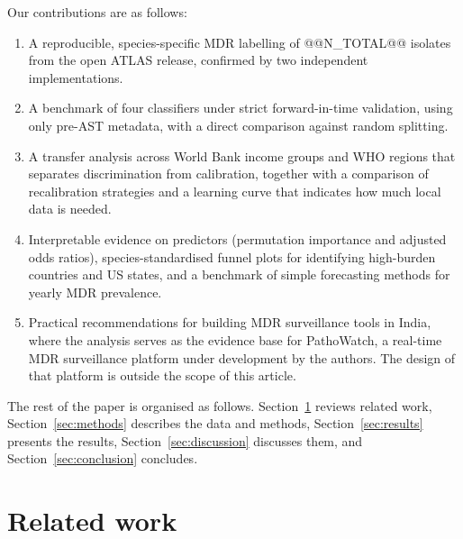 \documentclass[11pt,a4paper]{article}
\begin{document}
Our contributions are as follows:
\begin{enumerate}
\item A reproducible, species-specific MDR labelling of @@N_TOTAL@@ isolates from the open ATLAS release, confirmed by two independent implementations.
\item A benchmark of four classifiers under strict forward-in-time validation, using only pre-AST metadata, with a direct comparison against random splitting.
\item A transfer analysis across World Bank income groups and WHO regions that separates discrimination from calibration, together with a comparison of recalibration strategies and a learning curve that indicates how much local data is needed.
\item Interpretable evidence on predictors (permutation importance and adjusted odds ratios), species-standardised funnel plots for identifying high-burden countries and US states, and a benchmark of simple forecasting methods for yearly MDR prevalence.
\item Practical recommendations for building MDR surveillance tools in India, where the analysis serves as the evidence base for PathoWatch, a real-time MDR surveillance platform under development by the authors. The design of that platform is outside the scope of this article.
\end{enumerate}

The rest of the paper is organised as follows. Section~\ref{sec:related} reviews related work, Section~\ref{sec:methods} describes the data and methods, Section~\ref{sec:results} presents the results, Section~\ref{sec:discussion} discusses them, and Section~\ref{sec:conclusion} concludes.

\section{Related work}\label{sec:related}
\end{document}
